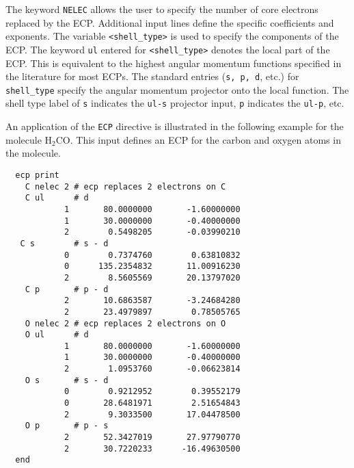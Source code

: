
The keyword \verb+NELEC+ allows the user to specify the number of core
electrons replaced by the ECP.
Additional input lines define the specific
coefficients and exponents.  The variable \verb+<shell_type>+ is used to
specify the components of the ECP.  The keyword \verb+ul+ entered for
\verb+<shell_type>+ denotes the local part of the ECP.  This is equivalent to
the highest angular momentum functions specified in the literature for
most ECPs.  The standard entries (\verb+s, p, d+, etc.) for
\verb+shell_type+ specify the angular momentum projector onto the
local function.  The shell type label of \verb+s+ indicates the
\verb+ul-s+ projector input, \verb+p+ indicates the \verb+ul-p+, etc.

An application of the \verb+ECP+ directive is illustrated in the
following example for the molecule H$_2$CO.  This input defines an ECP
for the carbon and oxygen atoms in the molecule.


\begin{verbatim}
  ecp print  
    C nelec 2 # ecp replaces 2 electrons on C
    C ul      # d
            1       80.0000000       -1.60000000
            1       30.0000000       -0.40000000
            2        0.5498205       -0.03990210
   C s        # s - d 
            0        0.7374760        0.63810832
            0      135.2354832       11.00916230
            2        8.5605569       20.13797020
    C p       # p - d
            2       10.6863587       -3.24684280
            2       23.4979897        0.78505765
    O nelec 2 # ecp replaces 2 electrons on O
    O ul      # d 
            1       80.0000000       -1.60000000
            1       30.0000000       -0.40000000
            2        1.0953760       -0.06623814
    O s       # s - d
            0        0.9212952        0.39552179
            0       28.6481971        2.51654843
            2        9.3033500       17.04478500
    O p       # p - s 
            2       52.3427019       27.97790770
            2       30.7220233      -16.49630500
  end
\end{verbatim}


